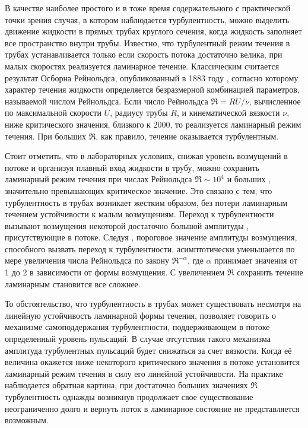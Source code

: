 В качестве наиболее простого и в тоже время содержательного с практической точки зрения случая, в котором наблюдается турбулентность, можно выделить движение жидкости в прямых трубах круглого сечения, когда жидкость заполняет все пространство внутри трубы. Известно, что турбулентный режим течения в трубах устанавливается только если скорость потока достаточно велика, при малых скоростях реализуется ламинарное течение. Классическим считается результат Осборна Рейнольдса, опубликованный в 1883 году \cite{Reynolds1883}, согласно которому характер течения жидкости определяется безразмерной комбинацией параметров, называемой числом Рейнольдса. Если число Рейнольдса $\Re = RU/\nu$, вычисленное по максимальной скорости $U$, радиусу трубы $R$, и кинематической вязкости $\nu$, ниже критического значения, близкого к $2000$, то реализуется ламинарный режим течения. При больших $\Re$, как правило, течение оказывается турбулентным. 

Стоит отметить, что в лабораторных условиях, снижая уровень возмущений в потоке и организуя плавный вход жидкости в трубу, можно сохранить ламинарный режим течения при числах Рейнольдса $\Re \sim 10^4$ и больших \cite{Wygnanski1973, Darbyshire1995, vanDoorne2009}, значительно превышающих критическое значение. Это связано с тем, что турбулентность в трубах возникает жестким образом, без потери ламинарным течением устойчивости к малым возмущениям. Переход к турбулентности вызывают возмущения некоторой достаточно большой амплитуды \cite{Grossmann2000}, присутствующие в потоке. Следуя \cite{Darbyshire1995, Hof2003, Peixinho2007, Mellibovsky2009critical}, пороговое значение амплитуды возмущения, способного вызвать переход к турбулентности, асимптотически уменьшается по мере увеличения числа Рейнольдса по закону $\Re^{-\alpha}$, где $\alpha$ принимает значения от 1 до 2 в зависимости от формы возмущения. С увеличением $\Re$ сохранить течение ламинарным становится все сложнее. 

То обстоятельство, что турбулентность в трубах может существовать несмотря на линейную устойчивость ламинарной формы течения, позволяет говорить о механизме самоподдержания турбулентности, поддерживающем в потоке определенный уровень пульсаций. В случае отсутствия такого механизма амплитуда турбулентных пульсаций будет снижаться за счет вязкости. Когда её величина окажется ниже некоторого критического значения в потоке установится ламинарный режим течения в силу его линейной устойчивости. На практике наблюдается обратная картина, при достаточно больших значениях $\Re$ турбулентность однажды возникнув продолжает свое существование неограниченно долго и вернуть поток в ламинарное состояние не представляется возможным. 

